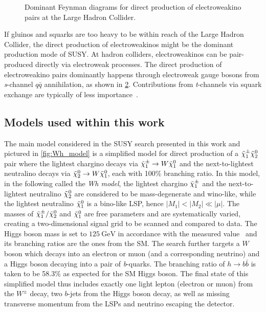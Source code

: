 \begin{figure}
\begin{subfigure}[b]{0.33\linewidth}
		\caption{\label{fig:electroweakino_production_3}}
	\end{subfigure}	
	\caption{Dominant Feynman diagrams for direct production of electroweakino pairs at the Large Hadron Collider.}\label{fig:electroweakino_production}
\end{figure}

If gluinos and squarks are too heavy to be within reach of the Large Hadron Collider, the direct production of electroweakinos might be the dominant production mode of SUSY. At hadron colliders, electroweakinos can be pair-produced directly via electroweak processes. The direct production of electroweakino pairs dominantly happens through electroweak gauge bosons from \textit{s}-channel $q\bar{q}$ annihilation, as shown in \cref{fig:electroweakino_production}. Contributions from \textit{t}-channels via squark exchange are typically of less importance~\cite{Martin:1997ns}.


\subsection{Models used within this work}

The main model considered in the SUSY search presented in this work and pictured in \cref{fig:Wh_model} is a simplified model for direct production of a $\tilde{\chi}_1^\pm\tilde{\chi}_2^0$ pair where the lightest chargino decays via $\tilde{\chi}_1^\pm\rightarrow W\tilde{\chi}_1^0$ and the next-to-lightest neutralino decays via $\tilde{\chi}_2^0\rightarrow W\tilde{\chi}_1^0$, each with 100\% branching ratio. In this model, in the following called the \textit{Wh model}, the lightest chargino $\tilde{\chi}_1^\pm$ and the next-to-lightest neutralino $\tilde{\chi}_2^0$ are considered to be mass-degenerate and wino-like, while the lightest neutralino $\tilde{\chi}_1^0$ is a bino-like LSP, hence $\vert M_1 \vert < \vert M_2 \vert \ll \vert\mu\vert$. The masses of $\tilde{\chi}_1^\pm/\tilde{\chi}_2^0$ and $\tilde{\chi}_1^0$ are free parameters and are systematically varied, creating a two-dimensional signal grid to be scanned and compared to data. The Higgs boson mass is set to $\SI{125}{\GeV}$ in accordance with the measured value~\cite{Aad:2012tfa,Chatrchyan:2012ufa} and its branching ratios are the ones from the SM. The search further targets a $W$ boson which decays into an electron or muon (and a corresponding neutrino) and a Higgs boson decaying into a pair of \textit{b}-quarks. The branching ratio of $h\rightarrow b\bar{b}$ is taken to be 58.3\% as expected for the SM Higgs boson. The final state of this simplified model thus includes exactly one light lepton (electron or muon) from the $W^\pm$ decay, two $b$-jets from the Higgs boson decay, as well as missing transverse momentum from the LSPs and neutrino escaping the detector.

